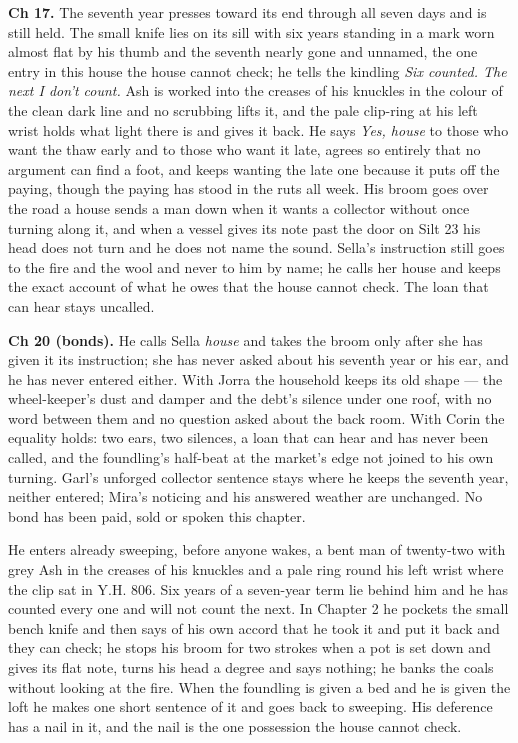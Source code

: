 \documentclass{design/chronicle}
\begin{document}
{\textbf{Ch 17.} The seventh year presses toward its end through all seven days and is still held. The small knife lies on its sill with six years standing in a mark worn almost flat by his thumb and the seventh nearly gone and unnamed, the one entry in this house the house cannot check; he tells the kindling \emph{Six counted. The next I don’t count.} Ash is worked into the creases of his knuckles in the colour of the clean dark line and no scrubbing lifts it, and the pale clip-ring at his left wrist holds what light there is and gives it back. He says \emph{Yes, house} to those who want the thaw early and to those who want it late, agrees so entirely that no argument can find a foot, and keeps wanting the late one because it puts off the paying, though the paying has stood in the ruts all week. His broom goes over the road a house sends a man down when it wants a collector without once turning along it, and when a vessel gives its note past the door on Silt 23 his head does not turn and he does not name the sound. Sella’s instruction still goes to the fire and the wool and never to him by name; he calls her house and keeps the exact account of what he owes that the house cannot check. The loan that can hear stays uncalled.

\textbf{Ch 20 (bonds).} He calls Sella \emph{house} and takes the broom only after she has given it its instruction; she has never asked about his seventh year or his ear, and he has never entered either. With Jorra the household keeps its old shape --- the wheel-keeper’s dust and damper and the debt’s silence under one roof, with no word between them and no question asked about the back room. With Corin the equality holds: two ears, two silences, a loan that can hear and has never been called, and the foundling’s half-beat at the market’s edge not joined to his own turning. Garl’s unforged collector sentence stays where he keeps the seventh year, neither entered; Mira’s noticing and his answered weather are unchanged. No bond has been paid, sold or spoken this chapter.

He enters already sweeping, before anyone wakes, a bent man of twenty-two with grey Ash in the creases of his knuckles and a pale ring round his left wrist where the clip sat in Y.H. 806. Six years of a seven-year term lie behind him and he has counted every one and will not count the next. In Chapter 2 he pockets the small bench knife and then says of his own accord that he took it and put it back and they can check; he stops his broom for two strokes when a pot is set down and gives its flat note, turns his head a degree and says nothing; he banks the coals without looking at the fire. When the foundling is given a bed and he is given the loft he makes one short sentence of it and goes back to sweeping. His deference has a nail in it, and the nail is the one possession the house cannot check.

}
\end{document}
